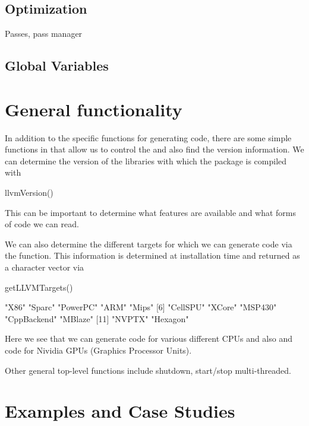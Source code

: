 \documentclass[article]{jss}
\def\Rllvm{\Rpkg{Rllvm}}
\begin{document}
\subsection{Optimization}
Passes, pass manager



\subsection{Global Variables}


\section[General LLVM functionality]{General \llvm{} functionality}

In addition to the specific functions for generating code,
there are some simple functions in \Rllvm{} that
allow us to control the \llvm{} and also find the
version information.
We can determine the version of the \llvm{} libraries
with which the \R{} package is compiled with
\begin{RCode}
llvmVersion()  
\end{RCode}
This can be important to determine what features are available
and what forms of code we can read.


We can also determine the different targets 
for which we can generate  code via the 
function. This information is determined at installation time
and returned as a character vector  via 
\begin{RCode}
getLLVMTargets()
\end{RCode}
\begin{ROutput}
 [1] "X86"        "Sparc"      "PowerPC"    "ARM"        "Mips"      
 [6] "CellSPU"    "XCore"      "MSP430"     "CppBackend" "MBlaze"    
[11] "NVPTX"      "Hexagon"     
\end{ROutput}
Here we see that we can generate code for various different CPUs
and also \Cpp{} and  code for  Nividia GPUs (Graphics
Processor Units).

Other general top-level functions include 
shutdown, start/stop multi-threaded.

\section{Examples and Case Studies}
\end{document}

